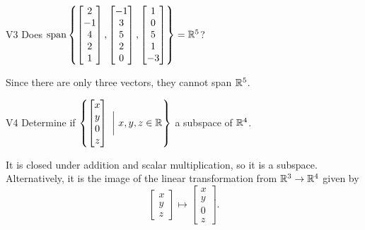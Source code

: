 \documentclass{sbgLAexam}
\begin{document}
\begin{extract}\newpage\end{extract}
\begin{problem}{V3}
Does
\(
  \operatorname{span}\left\{
    \begin{bmatrix} 2 \\ -1 \\ 4 \\ 2 \\ 1 \end{bmatrix},
    \begin{bmatrix} -1 \\ 3 \\ 5 \\ 2 \\ 0 \end{bmatrix},
    \begin{bmatrix} 1 \\ 0 \\ 5 \\ 1 \\ -3 \end{bmatrix}
  \right\} = \mathbb{R}^5
\)?
\end{problem}
\begin{solution}
Since there are only three vectors, they cannot span \(\mathbb{R}^5\).
\end{solution}
\begin{problem}{V4}
Determine if $\left\{ \begin{bmatrix} x \\ y \\ 0 \\ z \end{bmatrix}\  \bigg|\ x,y,z \in \mathbb{R}\right\}$  a subspace of $\mathbb{R}^4$.
\end{problem}
\begin{solution}
It is closed under addition and scalar multiplication, so it is a subspace.  Alternatively, it is the image of the linear transformation from $\mathbb{R}^3 \rightarrow \mathbb{R}^4$ given by $$\begin{bmatrix} x \\ y \\ z \end{bmatrix} \mapsto  \begin{bmatrix} x \\ y \\ 0 \\ z \end{bmatrix}.$$
\end{solution}
\end{document}
